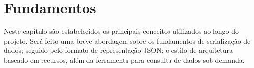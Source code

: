 \chapter{Fundamentos}

Neste capítulo são estabelecidos os principais conceitos utilizados ao longo do projeto. Será feito uma breve abordagem sobre os fundamentos de serialização de dados; seguido pelo formato de representação JSON; o estilo de arquitetura baseado em recursos, além da ferramenta para consulta de dados sob demanda.





